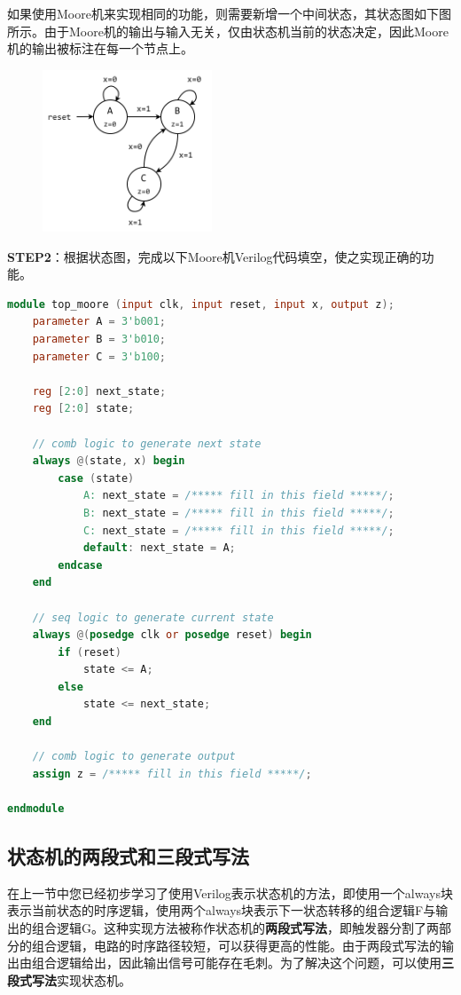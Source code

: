 \documentclass{ctexart}
\begin{document}
如果使用Moore机来实现相同的功能，则需要新增一个中间状态，其状态图如下图所示。由于Moore机的输出与输入无关，仅由状态机当前的状态决定，因此Moore机的输出被标注在每一个节点上。

\begin{figure}[H]
    \centering
    \includegraphics[width=0.45\textwidth]{lab2/6.png}
\end{figure}

\textbf{STEP2}：根据状态图，完成以下Moore机Verilog代码填空，使之实现正确的功能。
\begin{lstlisting}[language=Verilog]
module top_moore (input clk, input reset, input x, output z); 
    parameter A = 3'b001;
    parameter B = 3'b010;
    parameter C = 3'b100;
    
    reg [2:0] next_state;
    reg [2:0] state;

    // comb logic to generate next state
    always @(state, x) begin
        case (state)
            A: next_state = /***** fill in this field *****/;
            B: next_state = /***** fill in this field *****/;
            C: next_state = /***** fill in this field *****/;
            default: next_state = A;
        endcase
    end

    // seq logic to generate current state
    always @(posedge clk or posedge reset) begin
        if (reset)
            state <= A;
        else
            state <= next_state;
    end

    // comb logic to generate output
    assign z = /***** fill in this field *****/;

endmodule
\end{lstlisting}

\subsection{状态机的两段式和三段式写法}

在上一节中您已经初步学习了使用Verilog表示状态机的方法，即使用一个always块表示当前状态的时序逻辑，使用两个always块表示下一状态转移的组合逻辑F与输出的组合逻辑G。这种实现方法被称作状态机的\textbf{两段式写法}，即触发器分割了两部分的组合逻辑，电路的时序路径较短，可以获得更高的性能。由于两段式写法的输出由组合逻辑给出，因此输出信号可能存在毛刺。为了解决这个问题，可以使用\textbf{三段式写法}实现状态机。
\end{document}
